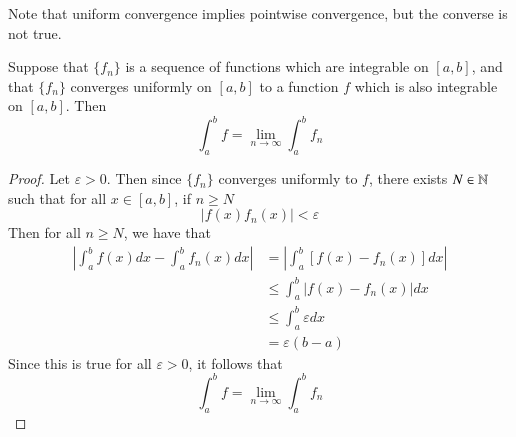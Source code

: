 \documentclass[12pt, a4paper, oneside, openright, titlepage]{book}
\begin{document}
\begin{rmk}
    Note that uniform convergence implies pointwise convergence, but the converse is not true.
\end{rmk}

\begin{thm}
    Suppose that $\{f_n\}$ is a sequence of functions which are integrable on $[a,b]$, and that $\{f_n\}$ converges uniformly on $[a,b]$ to a function $f$ which is also integrable on $[a,b]$. Then \begin{equation*}
        \int_a^bf = \lim\limits_{n\rightarrow \infty}\int_a^bf_n
    \end{equation*}
\end{thm}
\begin{proof}
    Let $\varepsilon > 0$. Then since $\{f_n\}$ converges uniformly to $f$, there exists $N \in \mathbb N$ such that for all $x \in [a,b]$, if $n \geq N$ \begin{equation*}
        |f(x) f_n(x)| < \varepsilon
    \end{equation*}
    Then for all $n \geq N$, we have that \begin{align*}
        \left|\int_a^bf(x)dx - \int_a^bf_n(x)dx\right| &= \left|\int_a^b[f(x) - f_n(x)]dx\right| \\
        &\leq \int_a^b |f(x) - f_n(x)| dx \\
        &\leq \int_a^b\varepsilon dx \\
        &= \varepsilon (b-a)
    \end{align*}
    Since this is true for all $\varepsilon > 0$, it follows that \begin{equation*}
        \int_a^bf = \lim\limits_{n\rightarrow \infty}\int_a^bf_n
    \end{equation*}
\end{proof}
\end{document}
